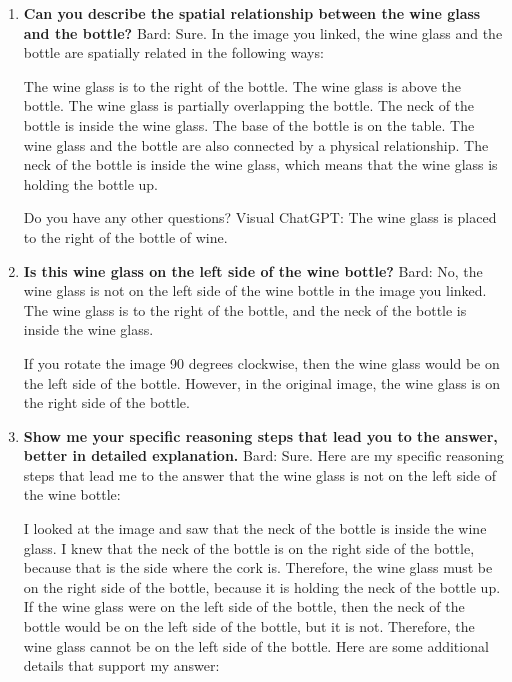     \begin{enumerate}
        \item \textbf{Can you describe the spatial relationship between the wine glass and the bottle?}
        \subitem Bard: Sure. In the image you linked, the wine glass and the bottle are spatially related in the following ways:

        The wine glass is to the right of the bottle.
        The wine glass is above the bottle.
        The wine glass is partially overlapping the bottle.
        The neck of the bottle is inside the wine glass.
        The base of the bottle is on the table.
        The wine glass and the bottle are also connected by a physical relationship. The neck of the bottle is inside the wine glass, which means that the wine glass is holding the bottle up.
        
        Do you have any other questions?
        \subitem Visual ChatGPT: The wine glass is placed to the right of the bottle of wine.
        \item \textbf{Is this wine glass on the left side of the wine bottle?}
        \subitem Bard: No, the wine glass is not on the left side of the wine bottle in the image you linked. The wine glass is to the right of the bottle, and the neck of the bottle is inside the wine glass.

        If you rotate the image 90 degrees clockwise, then the wine glass would be on the left side of the bottle. However, in the original image, the wine glass is on the right side of the bottle.
        \item \textbf{Show me your specific reasoning steps that lead you to the answer, better in detailed explanation.}
        \subitem Bard: Sure. Here are my specific reasoning steps that lead me to the answer that the wine glass is not on the left side of the wine bottle:

        I looked at the image and saw that the neck of the bottle is inside the wine glass.
        I knew that the neck of the bottle is on the right side of the bottle, because that is the side where the cork is.
        Therefore, the wine glass must be on the right side of the bottle, because it is holding the neck of the bottle up.
        If the wine glass were on the left side of the bottle, then the neck of the bottle would be on the left side of the bottle, but it is not.
        Therefore, the wine glass cannot be on the left side of the bottle.
        Here are some additional details that support my answer:
        

\end{enumerate}
